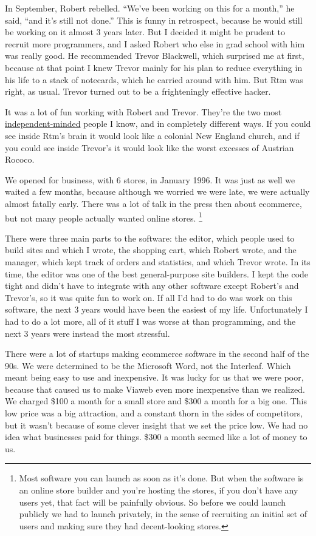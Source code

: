\documentclass[12pt]{book}
\begin{document}
In September, Robert rebelled. ``We've been working on this for a
month,'' he said, ``and it's still not done.'' This is funny in
retrospect, because he would still be working on it almost 3 years
later. But I decided it might be prudent to recruit more programmers,
and I asked Robert who else in grad school with him was really good. He
recommended Trevor Blackwell, which surprised me at first, because at
that point I knew Trevor mainly for his plan to reduce everything in his
life to a stack of notecards, which he carried around with him. But Rtm
was right, as usual. Trevor turned out to be a frighteningly effective
hacker.

It was a lot of fun working with Robert and Trevor. They're the two most
\href{think.html}{independent-minded} people I know, and in completely
different ways. If you could see inside Rtm's brain it would look like a
colonial New England church, and if you could see inside Trevor's it
would look like the worst excesses of Austrian Rococo.

We opened for business, with 6 stores, in January 1996. It was just as
well we waited a few months, because although we worried we were late,
we were actually almost fatally early. There was a lot of talk in the
press then about ecommerce, but not many people actually wanted online
stores. \footnote{Most software you can launch as soon as it's done. But when the
software is an online store builder and you're hosting the stores, if
you don't have any users yet, that fact will be painfully obvious. So
before we could launch publicly we had to launch privately, in the sense
of recruiting an initial set of users and making sure they had
decent-looking stores.}

There were three main parts to the software: the editor, which people
used to build sites and which I wrote, the shopping cart, which Robert
wrote, and the manager, which kept track of orders and statistics, and
which Trevor wrote. In its time, the editor was one of the best
general-purpose site builders. I kept the code tight and didn't have to
integrate with any other software except Robert's and Trevor's, so it
was quite fun to work on. If all I'd had to do was work on this
software, the next 3 years would have been the easiest of my life.
Unfortunately I had to do a lot more, all of it stuff I was worse at
than programming, and the next 3 years were instead the most stressful.

There were a lot of startups making ecommerce software in the second
half of the 90s. We were determined to be the Microsoft Word, not the
Interleaf. Which meant being easy to use and inexpensive. It was lucky
for us that we were poor, because that caused us to make Viaweb even
more inexpensive than we realized. We charged \$100 a month for a small
store and \$300 a month for a big one. This low price was a big
attraction, and a constant thorn in the sides of competitors, but it
wasn't because of some clever insight that we set the price low. We had
no idea what businesses paid for things. \$300 a month seemed like a lot
of money to us.
\end{document}
